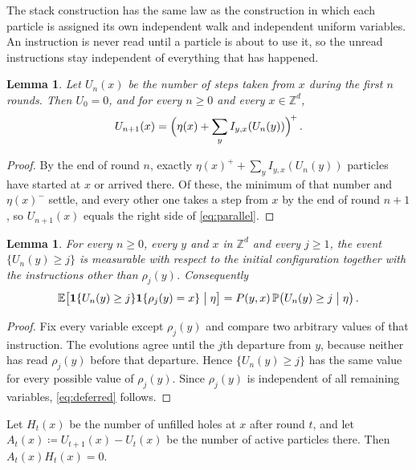 \documentclass[11pt]{amsart}
\theoremstyle{plain}
\newtheorem{lemma}[theorem]{Lemma}
\theoremstyle{definition}
\newcommand{\Z}{\mathbb{Z}}
\newcommand{\E}{\mathbb{E}}
\renewcommand{\P}{\mathbb{P}}
\newcommand{\one}{\mathbf{1}}
\begin{document}
The stack construction has the same law as the construction in which each particle is assigned its own independent walk and independent uniform variables. An instruction is never read until a particle is about to use it, so the unread instructions stay independent of everything that has happened.

\begin{lemma}\label{lem:parallel}
	Let $U_n(x)$ be the number of steps taken from $x$ during the first $n$
	rounds. Then $U_0=0$, and for every $n\geq0$ and every $x\in\Z^d$,
	\begin{equation}\label{eq:parallel}
		U_{n+1}(x)=\Bigl(\eta(x)+\sum_yI_{y,x}(U_n(y))\Bigr)^{\!+}\,.
	\end{equation}
\end{lemma}

\begin{proof}
	By the end of round $n$, exactly $\eta(x)^+ +\sum_yI_{y,x}(U_n(y))$ particles have started at $x$ or arrived there. Of these, the minimum of that number and $\eta(x)^-$ settle, and every other one takes a step from $x$ by the end of round $n+1$, so $U_{n+1}(x)$ equals the right side of \eqref{eq:parallel}.
\end{proof}

\begin{lemma}\label{lem:deferred}
	For every $n\geq0$, every $y$ and $x$ in $\Z^d$ and every $j\geq1$, the event
	$\{U_n(y)\geq j\}$ is measurable with respect to the initial configuration
	together with the instructions other than $\rho_j(y)$. Consequently
	\begin{equation}\label{eq:deferred}
		\E\bigl[\one\{U_n(y)\geq j\}\one\{\rho_j(y)=x\}\bigm|\eta\bigr]
		=P(y,x)\,\P\bigl(U_n(y)\geq j\bigm|\eta\bigr)\,.
	\end{equation}
\end{lemma}

\begin{proof}
	Fix every variable except $\rho_j(y)$ and compare two arbitrary values of
	that instruction. The evolutions agree until the $j$th departure from $y$,
	because neither has read $\rho_j(y)$ before that departure. Hence
	$\{U_n(y)\geq j\}$ has the same value for every possible value of
	$\rho_j(y)$. Since $\rho_j(y)$ is independent of all remaining variables,
	\eqref{eq:deferred} follows.
\end{proof}

Let $H_t(x)$ be the number of unfilled holes at $x$ after round $t$, and let
$A_t(x)\coloneqq U_{t+1}(x)-U_t(x)$ be the number of active particles there.
Then $A_t(x)H_t(x)=0$.
\end{document}
